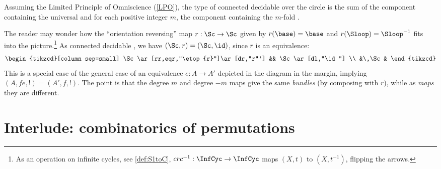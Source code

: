 \begin{lemma}
  \label{lem:componentsofcoversofS1}
Assuming the Limited Principle of Omniscience (\cref{LPO}), the type of connected decidable \coverings over the circle is the sum
of the component containing the universal \covering and for each positive integer $m$,
the component containing the $m$-fold \covering.
\end{lemma}

\begin{remark}
  \label{rem:flipthecircle}
The reader may wonder how the ``orientation reversing'' map $r:\Sc\to \Sc$ given
by $r(\base)=\base$ and $r(\Sloop)=\Sloop^{-1}$ fits into the picture.\footnote{%
  As an operation on infinite cycles, see \cref{def:S1toC},
  $c r c^{-1} : \InfCyc\to\InfCyc$ maps $(X,t)$ to $(X,t^{-1})$,
  flipping the arrows.}
As connected decidable \coverings, we have
$(\Sc,r) = (\Sc,\id)$, since $r$ is an equivalence:
\[
  \begin{tikzcd}[column sep=small]
    \Sc\ar[rr,eqr,"\etop{r}"]\ar[dr,"r"'] && \Sc\ar[dl,"\id"] \\
    &\,\Sc&
  \end{tikzcd}
\]
This is a special case of the general case of an equivalence
$e: A\to A'$ depicted in the diagram in the margin, implying $(A,fe,!)=(A',f,!)$.
The point is that the degree $m$ and degree $-m$ maps give the same \emph{bundles} (by composing with $r$), while as \emph{maps} they are different.
\end{remark}

\section{Interlude: combinatorics of permutations}

